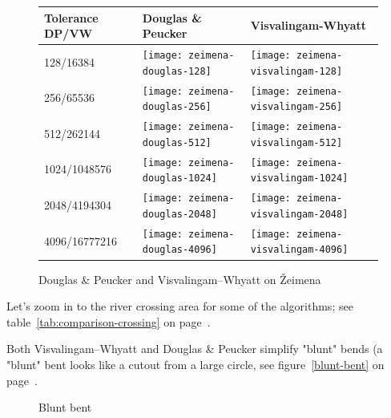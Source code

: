 \documentclass[a4paper]{article}
\newcommand{\DP}{Douglas \& Peucker}
\newcommand{\VW}{Visvalingam--Whyatt}
\begin{document}
\begin{figure}[h]
    \renewcommand{\tabularxcolumn}[1]{>{\center\small}m{#1}}
    \begin{tabularx}{\textwidth}{ p{2.1cm} | X | X | }
        Tolerance DP/VW                                                   &
        Douglas \& Peucker                                                &
        Visvalingam-Whyatt                                                \tabularnewline \hline

        128/16384                                                         &
        \texttt{[image: zeimena-douglas-128]}           &
        \texttt{[image: zeimena-visvalingam-128]}       \tabularnewline \hline

        256/65536                                                         &
        \texttt{[image: zeimena-douglas-256]}         &
        \texttt{[image: zeimena-visvalingam-256]}     \tabularnewline \hline

        512/262144                                                        &
        \texttt{[image: zeimena-douglas-512]}        &
        \texttt{[image: zeimena-visvalingam-512]}    \tabularnewline \hline

        1024/1048576                                                      &
        \texttt{[image: zeimena-douglas-1024]}      &
        \texttt{[image: zeimena-visvalingam-1024]}  \tabularnewline \hline

        2048/4194304                                                      &
        \texttt{[image: zeimena-douglas-2048]}     &
        \texttt{[image: zeimena-visvalingam-2048]} \tabularnewline \hline

        4096/16777216                                                     &
        \texttt{[image: zeimena-douglas-4096]}     &
        \texttt{[image: zeimena-visvalingam-4096]} \tabularnewline \hline
    \end{tabularx}
    \caption{{\DP} and {\VW} on Žeimena}
    \label{tab:comparison-zeimena}
\end{figure}

Let's zoom in to the river crossing area for some of the algorithms; see
table~\ref{tab:comparison-crossing} on page~\pageref{tab:comparison-crossing}.

Both {\VW} and {\DP} simplify "blunt" bends (a "blunt" bent looks like a cutout
from a large circle, see figure~\ref{blunt-bent} on page~\pageref{blunt-bent}.

\begin{figure}[h]
    \centering
    \caption{Blunt bent}
    \label{fig:blunt-bent}
\end{figure}
\end{document}
